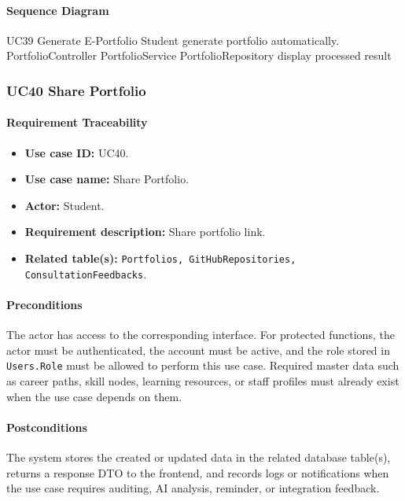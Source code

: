 \paragraph{Sequence Diagram}

\SequenceDiagram
{UC39 Generate E-Portfolio}
{Student}
{generate portfolio automatically.}
{PortfolioController}
{PortfolioService}
{PortfolioRepository}
{display processed result}

\subsubsection{UC40 Share Portfolio}

\paragraph{Requirement Traceability}

\begin{itemize}
    \item \textbf{Use case ID:} UC40.
    \item \textbf{Use case name:} Share Portfolio.
    \item \textbf{Actor:} Student.
    \item \textbf{Requirement description:} Share portfolio link.
    \item \textbf{Related table(s):} \texttt{Portfolios, GitHubRepositories, ConsultationFeedbacks}.
\end{itemize}

\paragraph{Preconditions}

The actor has access to the corresponding interface. For protected functions, the actor must be authenticated, the account must be active, and the role stored in \texttt{Users.Role} must be allowed to perform this use case. Required master data such as career paths, skill nodes, learning resources, or staff profiles must already exist when the use case depends on them.

\paragraph{Postconditions}

The system stores the created or updated data in the related database table(s), returns a response DTO to the frontend, and records logs or notifications when the use case requires auditing, AI analysis, reminder, or integration feedback.

